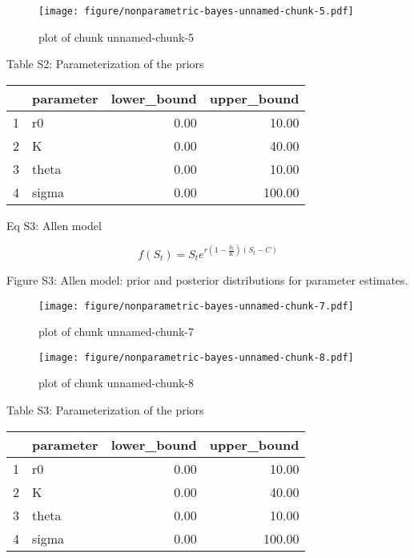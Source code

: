 \documentclass[author-year, review]{elsarticle} %
\makeatletter
\def\maxwidth{\ifdim\Gin@nat@width>\linewidth\linewidth
\else\Gin@nat@width\fi}
\let\Oldincludegraphics\includegraphics
\renewcommand{\includegraphics}[1]{\Oldincludegraphics[width=\maxwidth]{#1}}
\makeatother
\begin{document}
\begin{figure}[htbp]
\centering
\texttt{[image: figure/nonparametric-bayes-unnamed-chunk-5.pdf]}
\caption{plot of chunk unnamed-chunk-5}
\end{figure}

Table S2: Parameterization of the priors

\begin{table}[ht]
\begin{center}
\begin{tabular}{rlrr}
  \hline
 & parameter & lower\_bound & upper\_bound \\ 
  \hline
1 & r0 & 0.00 & 10.00 \\ 
  2 & K & 0.00 & 40.00 \\ 
  3 & theta & 0.00 & 10.00 \\ 
  4 & sigma & 0.00 & 100.00 \\ 
   \hline
\end{tabular}
\end{center}
\end{table}

Eq S3: Allen model

\[f(S_t) = S_t e^{r \left(1 - \frac{S_t}{K}\right)\left(S_t - C\right)} \]

Figure S3: Allen model: prior and posterior distributions for parameter
estimates.

\begin{figure}[htbp]
\centering
\texttt{[image: figure/nonparametric-bayes-unnamed-chunk-7.pdf]}
\caption{plot of chunk unnamed-chunk-7}
\end{figure}

\begin{figure}[htbp]
\centering
\texttt{[image: figure/nonparametric-bayes-unnamed-chunk-8.pdf]}
\caption{plot of chunk unnamed-chunk-8}
\end{figure}

Table S3: Parameterization of the priors

\begin{table}[ht]
\begin{center}
\begin{tabular}{rlrr}
  \hline
 & parameter & lower\_bound & upper\_bound \\ 
  \hline
1 & r0 & 0.00 & 10.00 \\ 
  2 & K & 0.00 & 40.00 \\ 
  3 & theta & 0.00 & 10.00 \\ 
  4 & sigma & 0.00 & 100.00 \\ 
   \hline
\end{tabular}
\end{center}
\end{table}
\end{document}
